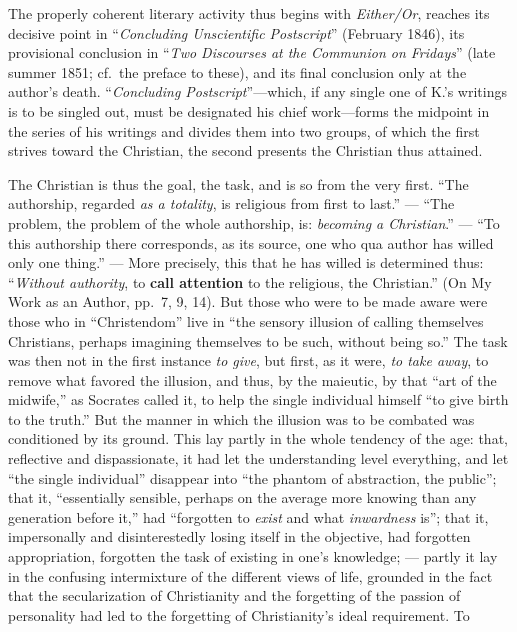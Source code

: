\documentclass[12pt,a4paper]{article}
\begin{document}
The properly coherent literary activity thus begins with \emph{Either/Or}, reaches
its decisive point in ``\emph{Concluding Unscientific Postscript}'' (February 1846), its
provisional conclusion in ``\emph{Two Discourses at the Communion on Fridays}'' (late
summer 1851; cf.\ the preface to these), and its final conclusion only at the
author's death. ``\emph{Concluding Postscript}''---which, if any single one of K.'s
writings is to be singled out, must be designated his chief work---forms the
midpoint in the series of his writings and divides them into two groups, of which
the first strives toward the Christian, the second presents the Christian thus
attained.

The Christian is thus the goal, the task, and is so from the very first. ``The
authorship, regarded \emph{as a totality}, is religious from first to last.'' ---
``The problem, the problem of the whole authorship, is: \emph{becoming a Christian}.''
--- ``To this authorship there corresponds, as its source, one who qua
author has willed only one thing.'' --- More precisely, this that he has willed is
determined thus: ``\emph{Without authority}, to \textbf{call attention} to the religious, the
Christian.'' (On My Work as an Author, pp.\ 7, 9, 14). But those who were to be
made aware were those who in ``Christendom'' live in ``the sensory illusion of
calling themselves Christians, perhaps imagining themselves to be such, without
being so.'' The task was then not in the first instance \emph{to give}, but first, as it
were, \emph{to take away}, to remove what favored the illusion, and thus, by the
maieutic, by that ``art of the midwife,'' as Socrates called it, to help the
single individual himself ``to give birth to the truth.'' But the manner in which
the illusion was to be combated was conditioned by its ground. This lay partly in
the whole tendency of the age: that, reflective and dispassionate, it had let the
understanding level everything, and let ``the single individual'' disappear into
``the phantom of abstraction, the public''; that it, ``essentially sensible,
perhaps on the average more knowing than any generation before it,'' had
``forgotten to \emph{exist} and what \emph{inwardness} is''; that it, impersonally
and disinterestedly losing itself in the objective, had forgotten appropriation,
forgotten the task of existing in one's knowledge; --- partly it lay in the
confusing intermixture of the different views of life, grounded in the fact that
the secularization of Christianity and the forgetting of the passion of
personality had led to the forgetting of Christianity's ideal requirement. To
\end{document}
